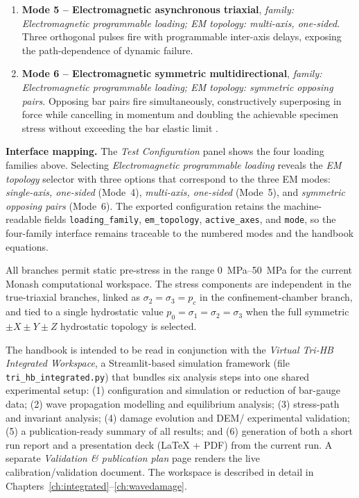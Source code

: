 \documentclass[11pt,a4paper,openany]{book}
\providecommand{\SIrange}[3]{\qtyrange{#1}{#2}{#3}}
\theoremstyle{handbook}
\newcommand{\sig}{\sigma}
\begin{document}
\begin{enumerate}[leftmargin=2.4em,itemsep=4pt]
{      Electromagnetic programmable loading; EM topology: single-axis,
      one-sided}. A capacitor-bank-driven coil generates a clean half-sine
      pulse on a single bar, with independently tunable amplitude and
      duration.
\item \textbf{Mode 5 -- Electromagnetic asynchronous triaxial}, \emph{family:
      Electromagnetic programmable loading; EM topology: multi-axis,
      one-sided}. Three orthogonal pulses fire with programmable inter-axis
      delays, exposing the path-dependence of dynamic failure.
\item \textbf{Mode 6 -- Electromagnetic symmetric multidirectional},
      \emph{family: Electromagnetic programmable loading; EM topology:
      symmetric opposing pairs}. Opposing bar pairs fire simultaneously,
      constructively superposing in force while cancelling in momentum and
      doubling the achievable specimen stress without exceeding the bar
      elastic limit \cite{xie2021}.
\end{enumerate}

\noindent\textbf{Interface mapping.} The \emph{Test Configuration} panel shows
the four loading families above. Selecting \emph{Electromagnetic programmable
loading} reveals the \emph{EM topology} selector with three options that
correspond to the three EM modes:
\emph{single-axis, one-sided} (Mode~4), \emph{multi-axis, one-sided}
(Mode~5), and \emph{symmetric opposing pairs} (Mode~6). The exported
configuration retains the machine-readable fields
\texttt{loading\_family}, \texttt{em\_topology}, \texttt{active\_axes}, and
\texttt{mode}, so the four-family interface remains traceable to the
numbered modes and the handbook equations.

\noindent All branches permit static pre-stress in the range
\SIrange{0}{50}{MPa} for the current Monash computational workspace.  The stress
components are independent in the true-triaxial branches, linked as
$\sig_2=\sig_3=p_c$ in the confinement-chamber branch, and tied to a
single hydrostatic value $p_0=\sig_1=\sig_2=\sig_3$ when the full
symmetric $\pm X\pm Y\pm Z$ hydrostatic topology is selected.

The handbook is intended to be read in conjunction with the
\emph{Virtual Tri-HB Integrated Workspace}, a Streamlit-based simulation framework
(file \texttt{tri\_hb\_integrated.py}) that bundles six analysis steps into
one shared experimental setup: (1) configuration and simulation or reduction
of bar-gauge data; (2) wave propagation modelling and equilibrium analysis;
(3) stress-path and invariant analysis; (4) damage evolution and DEM/
experimental validation; (5) a publication-ready summary of all results; and
(6) generation of both a short run report and a presentation deck (LaTeX +
PDF) from the current run. A separate \emph{Validation \& publication plan}
page renders the live calibration/validation document. The workspace is
described in detail in Chapters~\ref{ch:integrated}--\ref{ch:wavedamage}.
\end{document}
